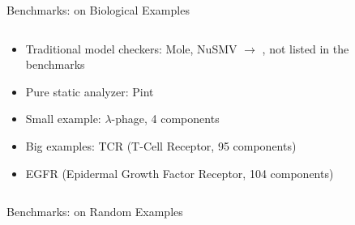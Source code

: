 \begin{frame}{Benchmarks: on Biological Examples}
\begin{columns}
\begin{column}{0.4\textwidth}
\begin{itemize}[<+->]
\item Traditional model checkers: Mole, NuSMV $\to$ , not listed in the benchmarks
\item Pure static analyzer: Pint~\cite{folschette2015}
\end{itemize}

\vspace{0.3cm}
\begin{itemize}[<+->]
\item Small example: $\lambda$-phage, 4 components
\item Big examples: TCR (T-Cell Receptor, 95 components)
\item EGFR (Epidermal Growth Factor Receptor, 104 components)
\end{itemize}
\end{column}
\begin{column}{0.6\textwidth}
\small
    \centering
    
\end{column}
\end{columns}
\end{frame}

\begin{frame}{Benchmarks: on Random Examples}
\onslide<1->{}

\vspace{0.2cm}
\begin{columns}
\begin{column}{0.5\textwidth}
\centering
{}
\end{column}
\begin{column}{0.5\textwidth}
\end{column}
\end{columns}
\end{frame}